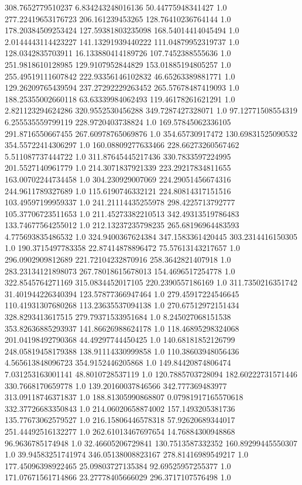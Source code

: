 308.7652779510237	6.834243248016136	50.44775948341427	1.0
277.22419653176723	206.161239453265	128.76410236764144	1.0
178.20384509253424	127.59381803235098	168.54014414045494	1.0
2.0144443114423227	141.13291939440222	111.04879952319737	1.0
128.0342835703911	16.133880414189726	107.7452388555636	1.0
251.9818610128985	129.9107952844829	153.01885194805257	1.0
255.49519111607842	222.93356146102832	46.65263389881771	1.0
129.26209765439594	237.27292229263452	265.57678487419093	1.0
188.25355002660118	63.63339984062493	119.46178261621291	1.0
2.821123294624286	320.9552530456288	349.7287427328071	1.0
97.12771508554319	6.255535559799119	228.9720403738824	1.0
169.57845062336105	291.8716550667455	267.60978765069876	1.0
354.65730917472	130.69831525090532	354.55722414306297	1.0
160.08809277633466	228.66273260567462	5.511087737444722	1.0
311.87645445217436	330.7833597224995	201.5527140961779	1.0
214.3071837921339	223.29217834811655	163.00702244734458	1.0
304.230929007069	224.29051456674316	244.9611789327689	1.0
115.6190746332121	224.80814317151516	103.49597199959337	1.0
241.21114435255978	298.4225713792777	105.37706723511653	1.0
211.45273382210513	342.49313519786483	133.74677564255012	1.0
212.13237235798235	265.68196964483593	4.775693835486532	1.0
324.9400367624384	347.1583361420445	303.2314416150305	1.0
190.3715497783358	22.87414878896472	75.57613143217657	1.0
296.0902909812689	221.72104232870916	258.3642821407918	1.0
283.23134121898073	267.78018615678013	154.4696517254778	1.0
322.8545764271169	315.0834452017105	220.2390557186169	1.0
311.7350216351742	31.401944226340394	123.57877366947464	1.0
279.45917224546645	110.41931307680268	113.23635537094138	1.0
270.67512972151434	328.8293413617515	279.79371533951684	1.0
8.245027068151538	353.82636885293937	141.86626988624178	1.0
118.46895298324068	201.04198492790368	44.49297744450425	1.0
140.68181852126799	248.05819458179388	138.91114330999858	1.0
110.38603948056436	4.565613848096723	354.9152446205868	1.0
149.84420874806474	7.031253163001141	48.8010728537119	1.0
120.7885703728094	182.60222731571446	330.7668170659778	1.0
139.20160037846566	342.777369483977	313.09118746371837	1.0
188.81305990868807	0.07981917165570618	332.37726683350843	1.0
214.06020658874002	157.1493205381736	135.77673062579527	1.0
216.15806446578318	57.92620689344017	251.44492516132277	1.0
262.61013467697654	14.76884300948868	96.9636785174948	1.0
32.46605206729841	130.7513587332352	160.89299445550307	1.0
39.94583251741974	346.05138008823167	278.81416989549217	1.0
177.45096398922465	25.09803727135384	92.69525957255377	1.0
171.07671561714866	23.27778405666029	296.3717107576498	1.0
